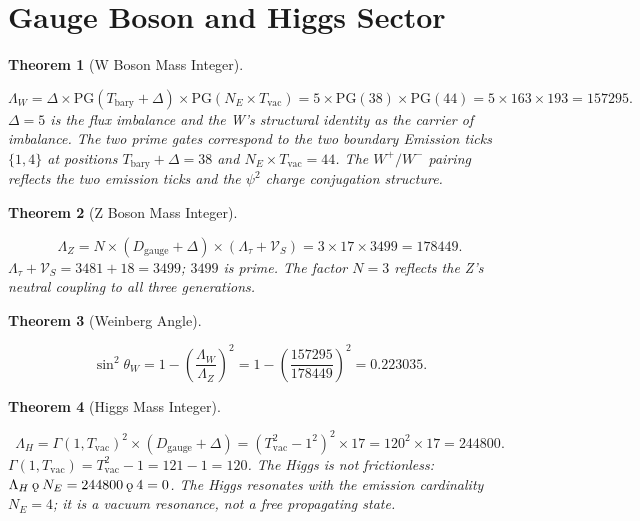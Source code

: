 \documentclass[11pt,letterpaper]{article}
\theoremstyle{plain}
\newtheorem{theorem}{Theorem}[section]
\theoremstyle{definition}
\theoremstyle{remark}
\newcommand{\koppa}{\mathbin{\text{\rm\k{o}}}}
\newcommand{\Tbary}{T_{\mathrm{bary}}}
\newcommand{\Tcharge}{\Gamma}
\newcommand{\Dg}{D_{\mathrm{gauge}}}
\newcommand{\VS}{\mathcal{V}_S}
\newcommand{\PG}{\mathrm{PG}}
\newcommand{\Tvac}{T_{\mathrm{vac}}}
\newcommand{\Lambdatau}{\Lambda_\tau}
\newcommand{\LambdaW}{\Lambda_W}
\newcommand{\LambdaZ}{\Lambda_Z}
\newcommand{\LambdaH}{\Lambda_H}
\begin{document}
\section{Gauge Boson and Higgs Sector}\label{sec:bosons}

\begin{theorem}[W Boson Mass Integer]\label{thm:W}
\begin{rsbox}
\[
\LambdaW=\Delta\times\PG(\Tbary+\Delta)\times\PG(N_E\times\Tvac)
=5\times\PG(38)\times\PG(44)=5\times163\times193=157295.
\]
$\Delta=5$ is the flux imbalance and the W's structural identity as
the carrier of imbalance.  The two prime gates correspond to the two
boundary Emission ticks $\{1,4\}$ at positions $\Tbary+\Delta=38$
and $N_E\times\Tvac=44$.  The $W^+/W^-$ pairing reflects the two
emission ticks and the $\psi^2$ charge conjugation structure.
\end{rsbox}
\end{theorem}

\begin{theorem}[Z Boson Mass Integer]\label{thm:Z}
\begin{rsbox}
\[
\LambdaZ=N\times(\Dg+\Delta)\times(\Lambdatau+\VS)
=3\times17\times3499=178449.
\]
$\Lambdatau+\VS=3481+18=3499$; $3499$ is prime.  The factor $N=3$
reflects the Z's neutral coupling to all three generations.
\end{rsbox}
\end{theorem}

\begin{theorem}[Weinberg Angle]\label{thm:weinberg}
\begin{rsbox}
\[
\sin^2\theta_W=1-\left(\frac{\LambdaW}{\LambdaZ}\right)^2
=1-\left(\frac{157295}{178449}\right)^2=0.223035.
\]
\end{rsbox}
\end{theorem}

\begin{theorem}[Higgs Mass Integer]\label{thm:higgs}
\begin{rsbox}
\[
\LambdaH=\Tcharge(1,\Tvac)^2\times(\Dg+\Delta)
=(\Tvac^2-1^2)^2\times17=120^2\times17=244800.
\]
$\Tcharge(1,\Tvac)=\Tvac^2-1=121-1=120$.  The Higgs is not
frictionless: $\LambdaH\koppa N_E=244800\koppa4=0$.  The Higgs
resonates with the emission cardinality $N_E=4$; it is a vacuum
resonance, not a free propagating state.
\end{rsbox}
\end{theorem}
\end{document}
